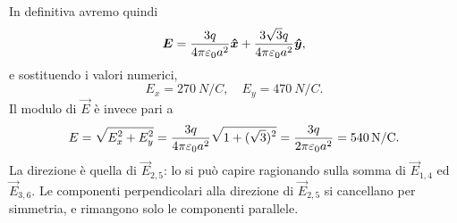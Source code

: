 \documentclass[10pt]{gulartcl}
\begin{document}
\begin{solution}
In definitiva avremo quindi
\begin{equation}
    \bm{E} = \frac{3 q}{4 \pi \varepsilon_0 a^{2}} \bm{\hat{x}} + \frac{3
    \sqrt{3} q}{4 \pi \varepsilon_0 a^{2}} \bm{\hat{y}},
\end{equation}
e sostituendo i valori numerici,
\begin{equation}
    E_x = \qty{270}{N/C}, \quad E_y = \qty{470}{N/C}.
\end{equation}
Il modulo di $\vec{E}$ è invece pari a
\begin{equation}
    E = \sqrt{\smash[b]{E_x^{2} + E_y^{2}}} = \frac{3 q}{4 \pi \varepsilon_0
    a^2} \sqrt{\smash[b]{1 + (\sqrt{3})^2}} = \frac{3 q}{2 \pi \varepsilon_0
    a^{2}} = \qty{540}{N/C}.
\end{equation}
La direzione è quella di $\vec{E}_{2, 5}$: lo si può capire
ragionando sulla somma di $\vec{E}_{1, 4}$ ed $\vec{E}_{3, 6}$. Le
componenti perpendicolari alla direzione di $\vec{E}_{2, 5}$ si cancellano
per simmetria, e rimangono solo le componenti parallele.
\end{solution}
\end{document}
